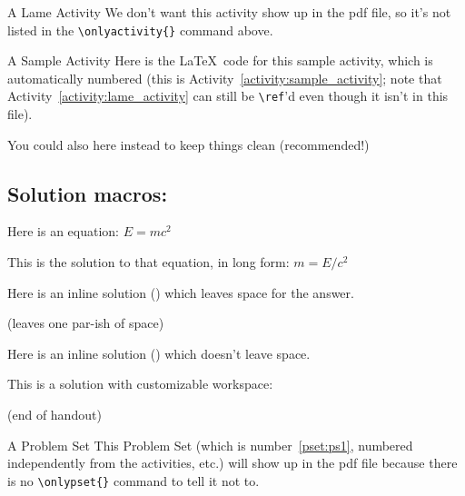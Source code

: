 \documentclass[12pt]{article}
\author{} %
\date{} %
\begin{document}
\begin{activity}{A Lame Activity}
	We don't want this activity show up in the pdf file, so it's not listed in the \verb|\onlyactivity{}| command above.
\end{activity}

\begin{activity}{A Sample Activity}
	Here is the \LaTeX\ code for this sample activity, which is automatically numbered (this is Activity~\ref{activity:sample_activity}; note that Activity~\ref{activity:lame_activity} can still be \verb|\ref|'d even though it isn't in this file).
	
	You could also \verb|| here instead to keep things clean (recommended!)
	
	\subsection*{Solution macros:}
		Here is an equation: $E=mc^2$
\begin{solution}
	    This is the solution to that equation, in long form: $m=E/c^2$
\end{solution}

	    Here is an inline solution () which leaves space for the answer.
    
	     (leaves one par-ish of space)
   
	   	Here is an inline solution () which doesn't leave space.
		
		This is a solution with customizable workspace:
		
		
		(end of handout)
\end{activity}

\begin{pset}[ps1]{A Problem Set}
	This Problem Set (which is number~\ref{pset:ps1}, numbered independently from the activities, etc.) will show up in the pdf file because there is no \verb|\onlypset{}| command to tell it not to.
\end{pset}
\end{document}
